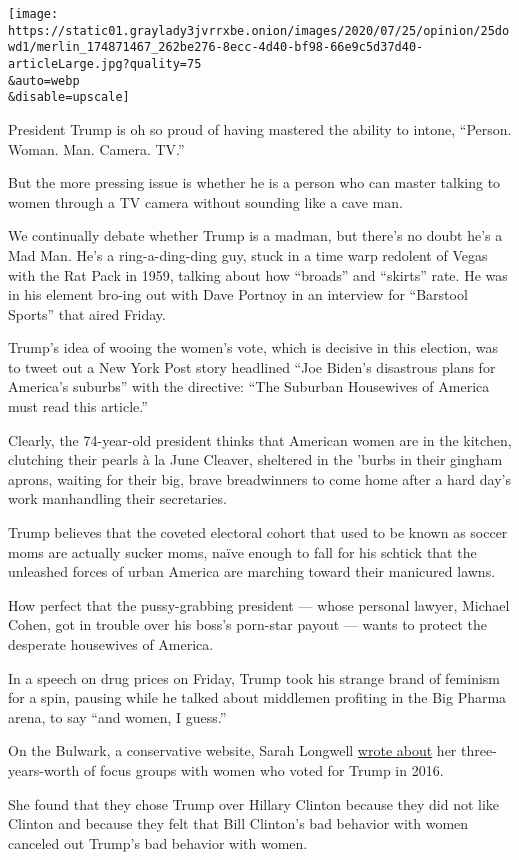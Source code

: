 \texttt{[image: https://static01.graylady3jvrrxbe.onion/images/2020/07/25/opinion/25dowd1/merlin\_174871467\_262be276-8ecc-4d40-bf98-66e9c5d37d40-articleLarge.jpg?quality=75\\\&auto=webp\\\&disable=upscale]}

President Trump is oh so proud of having mastered the ability to intone,
``Person. Woman. Man. Camera. TV.''

But the more pressing issue is whether he is a person who can master
talking to women through a TV camera without sounding like a cave man.

We continually debate whether Trump is a madman, but there's no doubt
he's a Mad Man. He's a ring-a-ding-ding guy, stuck in a time warp
redolent of Vegas with the Rat Pack in 1959, talking about how
``broads'' and ``skirts'' rate. He was in his element bro-ing out with
Dave Portnoy in an interview for ``Barstool Sports'' that aired Friday.

Trump's idea of wooing the women's vote, which is decisive in this
election, was to tweet out a New York Post story headlined ``Joe Biden's
disastrous plans for America's suburbs'' with the directive: ``The
Suburban Housewives of America must read this article.''

Clearly, the 74-year-old president thinks that American women are in the
kitchen, clutching their pearls à la June Cleaver, sheltered in the
'burbs in their gingham aprons, waiting for their big, brave
breadwinners to come home after a hard day's work manhandling their
secretaries.

Trump believes that the coveted electoral cohort that used to be known
as soccer moms are actually sucker moms, naïve enough to fall for his
schtick that the unleashed forces of urban America are marching toward
their manicured lawns.

How perfect that the pussy-grabbing president --- whose personal lawyer,
Michael Cohen, got in trouble over his boss's porn-star payout --- wants
to protect the desperate housewives of America.

In a speech on drug prices on Friday, Trump took his strange brand of
feminism for a spin, pausing while he talked about middlemen profiting
in the Big Pharma arena, to say ``and women, I guess.''

On the Bulwark, a conservative website, Sarah Longwell
\href{https://thebulwark.com/what-women-want/}{wrote about} her
three-years-worth of focus groups with women who voted for Trump in
2016.

She found that they chose Trump over Hillary Clinton because they did
not like Clinton and because they felt that Bill Clinton's bad behavior
with women canceled out Trump's bad behavior with women.

